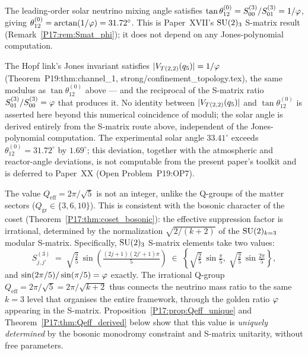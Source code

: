 \begin{proposition}
\label{P19:prop:solar_angle_jones}
The leading-order solar neutrino mixing angle satisfies
$\tan\theta_{12}^{(0)}=S_{00}^{(3)}/S_{01}^{(3)}=1/\varphi$, giving
$\theta_{12}^{(0)}=\arctan(1/\varphi)=31.72^\circ$. This is Paper~XVII's
$\mathrm{SU}(2)_3$ S-matrix result (Remark~\ref{P17:rem:Smat_phi}); it does
not depend on any Jones-polynomial computation.
\end{proposition}

\begin{remark}
\label{P19:rem:solar_physical}
The Hopf link's Jones invariant satisfies
$|V_{T(2,2)}(q_5)|=1/\varphi$ (Theorem~P19:thm:channel\_1,
strong/confinement\_topology.tex), the same modulus as
$\tan\theta_{12}^{(0)}$ above --- and the reciprocal of the S-matrix
ratio $S_{01}^{(3)}/S_{00}^{(3)}=\varphi$ that produces it. No identity
between $|V_{T(2,2)}(q_5)|$ and $\tan\theta_{12}^{(0)}$ is
asserted here beyond this numerical coincidence of moduli; the solar
angle is derived entirely from the S-matrix route above, independent
of the Jones-polynomial computation. The experimental solar angle
$33.41^\circ$ exceeds $\theta_{12}^{(0)}=31.72^\circ$ by $1.69^\circ$;
this deviation, together with the atmospheric and reactor-angle
deviations, is not computable from the present paper's toolkit and is
deferred to Paper~XX (Open Problem~P19:OP7).
\end{remark}

\begin{remark}
\label{P17:rem:Qeff_origin}
The value $Q_{\mathrm{eff}}=2\pi/\sqrt{5}$ is not an integer, unlike
the Q-groups of the matter sectors ($Q_{\mathrm{gr}}\in\{3,6,10\}$).
This is consistent with the bosonic character of the coset
(Theorem~\ref{P17:thm:coset_bosonic}): the effective suppression factor
is irrational, determined by the normalization $\sqrt{2/(k+2)}$
of the $\mathrm{SU}(2)_{k=3}$ modular S-matrix.  Specifically,
$\mathrm{SU}(2)_3$ S-matrix elements take two values:
\[
  S_{j,j'}^{(3)} \;=\; \sqrt{\tfrac{2}{5}}\,\sin\!\left(
    \tfrac{(2j+1)(2j'+1)\pi}{5}\right)
  \;\in\;
  \left\{\sqrt{\tfrac{2}{5}}\,\sin\tfrac{\pi}{5},\;
         \sqrt{\tfrac{2}{5}}\,\sin\tfrac{2\pi}{5}\right\},
\]
and $\sin(2\pi/5)/\sin(\pi/5)=\varphi$ exactly.  The irrational
Q-group $Q_{\mathrm{eff}}=2\pi/\sqrt{5}=2\pi/\sqrt{k+2}$ thus
connects the neutrino mass ratio to the same $k=3$ level that
organises the entire framework, through the golden ratio $\varphi$
appearing in the S-matrix.  Proposition~\ref{P17:prop:Qeff_unique} and
Theorem~\ref{P17:thm:Qeff_derived} below show that this value is
\emph{uniquely determined} by the bosonic monodromy constraint and
S-matrix unitarity, without free parameters.
\end{remark}

